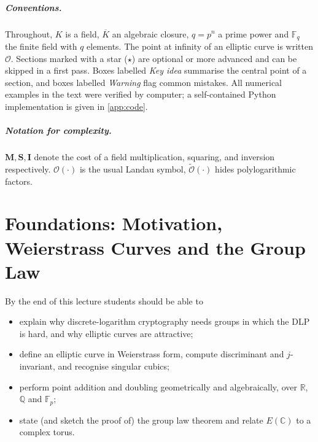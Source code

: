 \documentclass[11pt,a4paper,oneside]{book}
\theoremstyle{plain}
\theoremstyle{definition}
\theoremstyle{remark}
\newcommand{\Q}{\mathbb{Q}}
\newcommand{\R}{\mathbb{R}}
\newcommand{\C}{\mathbb{C}}
\newcommand{\F}{\mathbb{F}}
\newcommand{\Oinf}{\mathcal{O}}
\newcommand{\Kbar}{\overline{K}}
\newcommand{\bigO}{\mathcal{O}}
\newcommand{\softO}{\widetilde{\mathcal{O}}}
\newcommand{\Mul}{\mathbf{M}}
\newcommand{\Sqr}{\mathbf{S}}
\newcommand{\Inv}{\mathbf{I}}
\begin{document}
\paragraph{Conventions.} Throughout, $K$ is a field, $\Kbar$ an algebraic closure, $q=p^n$ a prime power and $\F_q$ the finite field with $q$ elements.
The point at infinity of an elliptic curve is written $\Oinf$. Sections marked with a star ($\star$) are optional or more advanced and can be skipped
in a first pass. Boxes labelled \emph{Key idea} summarise the central point of a section, and boxes labelled \emph{Warning} flag common mistakes.
All numerical examples in the text were verified by computer; a self-contained Python implementation is given in \cref{app:code}.

\paragraph{Notation for complexity.} $\Mul,\Sqr,\Inv$ denote the cost of a field multiplication, squaring, and inversion respectively.
$\bigO(\cdot)$ is the usual Landau symbol, $\softO(\cdot)$ hides polylogarithmic factors.

\tableofcontents
\listoffigures
\mainmatter
\chapter{Foundations: Motivation, Weierstrass Curves and the Group Law}\label{ch:L1}

\begin{goalsbox}
By the end of this lecture students should be able to
\begin{itemize}[nosep]
\item explain why discrete-logarithm cryptography needs groups in which the DLP is hard, and why elliptic curves are attractive;
\item define an elliptic curve in Weierstrass form, compute discriminant and $j$-invariant, and recognise singular cubics;
\item perform point addition and doubling geometrically and algebraically, over $\R$, $\Q$ and $\F_p$;
\item state (and sketch the proof of) the group law theorem and relate $E(\C)$ to a complex torus.
\end{itemize}
\end{goalsbox}
\end{document}
